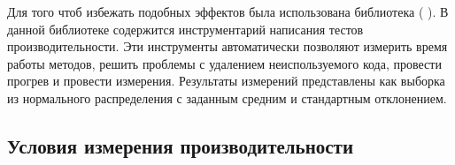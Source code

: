 Для того чтоб избежать подобных эффектов была использована библиотека \cite{jmh}(  ). В данной библиотеке содержится инструментарий написания тестов производительности. Эти инструменты автоматически позволяют измерить время работы методов, решить проблемы с удалением неиспользуемого кода, провести прогрев и провести измерения. Результаты измерений представлены как выборка из нормального распределения с заданным средним и стандартным отклонением.

\subsection{Условия измерения производительности}
